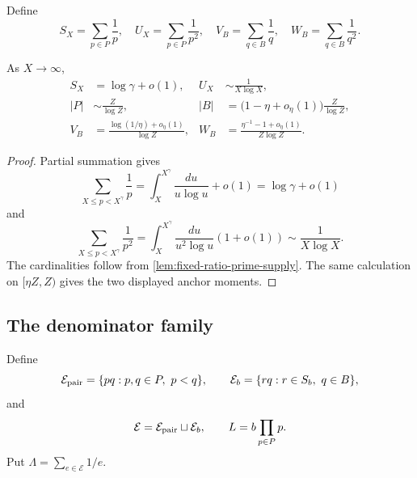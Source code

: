 Define
\[
 S_X=\sum_{p\in P}\frac1p,
 \quad U_X=\sum_{p\in P}\frac1{p^2},
 \quad V_B=\sum_{q\in B}\frac1q,
 \quad W_B=\sum_{q\in B}\frac1{q^2}.
\]

\begin{lemma}
\label{lem:reciprocal-prime-estimates}
As $X\to\infty$,
\begin{align}
 S_X&=\log\gamma+o(1), & U_X&\sim\frac1{X\log X},\label{eq:prime-moments}\\
 |P|&\sim\frac{Z}{\log Z}, & |B|&=\bigl(1-\eta+o_\eta(1)\bigr)\frac{Z}{\log Z},\label{eq:B-cardinality}\\
 V_B&=\frac{\log(1/\eta)+o_\eta(1)}{\log Z}, &
 W_B&=\frac{\eta^{-1}-1+o_\eta(1)}{Z\log Z}.
 \label{eq:B-power-sums}
\end{align}
\end{lemma}
\begin{proof}
Partial summation gives
\[
 \sum_{X\leq p<X^\gamma}\frac1p
 =\int_X^{X^\gamma}\frac{du}{u\log u}+o(1)=\log\gamma+o(1)
\]
and
\[
 \sum_{X\leq p<X^\gamma}\frac1{p^2}
 =\int_X^{X^\gamma}\frac{du}{u^2\log u}(1+o(1))\sim\frac1{X\log X}.
\]
The cardinalities follow from \cref{lem:fixed-ratio-prime-supply}. The same calculation on $[\eta Z,Z)$ gives the two displayed anchor moments.
\end{proof}

\subsection{The denominator family}

Define
\[
 \mathcal E_{\rm pair}=\{pq:p,q\in P,\ p<q\},
 \qquad
 \mathcal E_b=\{rq:r\in S_b,\ q\in B\},
\]
and
\begin{equation}
\label{eq:E-and-L}
 \mathcal E=\mathcal E_{\rm pair}\sqcup\mathcal E_b,
 \qquad L=b\prod_{p\in P}p.
\end{equation}
Put $\Lambda=\sum_{e\in\mathcal E}1/e$.

